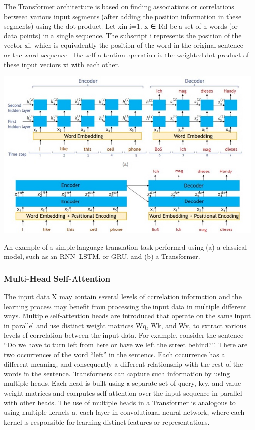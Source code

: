 \documentclass{article}
\begin{document}
The Transformer architecture is based on finding associations or correlations between various input segments (after adding the position information in these segments) using the dot product.
Let {xi}n i=1, x ∈ Rd be a set of n words (or data points) in a single sequence. The subscript i represents the position of the vector xi, which is equivalently the position of the word in the original sentence or the word sequence. The self-attention operation is the weighted dot product of these input vectors xi with each other.

\begin{center}
    \includegraphics[width=1\textwidth]{Picture4.jpg}
\end{center}

An example of a simple language translation task performed using (a) a classical model, such as an RNN, LSTM, or GRU, and (b) a Transformer.

\subsubsection{Multi-Head Self-Attention}
The input data X may contain several levels of correlation information and the learning process may benefit from processing the input data in multiple different ways. Multiple self-attention heads are introduced that operate on the same input in parallel and use distinct weight matrices Wq, Wk, and Wv, to extract various levels of correlation between the input data. For example, consider the sentence “Do we have to turn left from here or have we left the street behind?”. There are two occurrences of the word “left” in the sentence. Each occurrence has a different meaning, and consequently a different relationship with the rest of the words in the sentence. Transformers can capture such information by using multiple heads. Each head is built using a separate set of query, key, and value weight matrices and computes self-attention over the input sequence in parallel with other heads. The use of multiple heads in a Transformer is analogous to using multiple kernels at each layer in
convolutional neural network, where each kernel is responsible for learning distinct features or representations.
\end{document}

